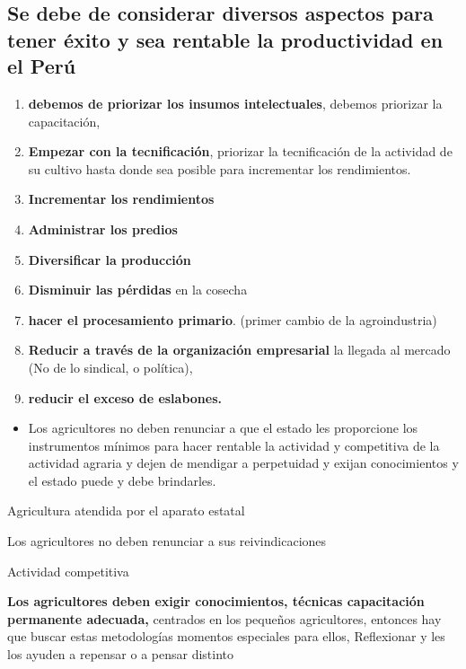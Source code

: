 \documentclass[
  a4paper,
]{article}
\providecommand{\tightlist}{%
  \setlength{\itemsep}{0pt}\setlength{\parskip}{0pt}}\usepackage{longtable,booktabs,array}
\begin{document}
\hypertarget{se-debe-de-considerar-diversos-aspectos-para-tener-uxe9xito-y-sea-rentable-la-productividad-en-el-peruxfa}{%
\subsection{Se debe de considerar diversos aspectos para tener éxito y
sea rentable la productividad en el
Perú}\label{se-debe-de-considerar-diversos-aspectos-para-tener-uxe9xito-y-sea-rentable-la-productividad-en-el-peruxfa}}

\begin{enumerate}
\def\labelenumi{\arabic{enumi}.}
\item
  \textbf{debemos de priorizar los insumos intelectuales}, debemos
  priorizar la capacitación,
\item
  \textbf{Empezar con la tecnificación}, priorizar la tecnificación de
  la actividad de su cultivo hasta donde sea posible para incrementar
  los rendimientos.
\item
  \textbf{Incrementar los rendimientos}
\item
  \textbf{Administrar los predios}
\item
  \textbf{Diversificar la producción}
\item
  \textbf{Disminuir las pérdidas} en la cosecha
\item
  \textbf{hacer el procesamiento primario}. (primer cambio de la
  agroindustria)
\item
  \textbf{Reducir a través de la organización empresarial} la llegada al
  mercado (No de lo sindical, o política),
\item
  \textbf{reducir el exceso de eslabones.}
\end{enumerate}

\begin{itemize}
\tightlist
\item
  Los agricultores no deben renunciar a que el estado les proporcione
  los instrumentos mínimos para hacer rentable la actividad y
  competitiva de la actividad agraria y dejen de mendigar a perpetuidad
  y exijan conocimientos y el estado puede y debe brindarles.
\end{itemize}

Agricultura atendida por el aparato estatal

Los agricultores no deben renunciar a sus reivindicaciones

Actividad competitiva

\textbf{Los agricultores deben exigir conocimientos, técnicas
capacitación permanente adecuada,} centrados en los pequeños
agricultores, entonces hay que buscar estas metodologías momentos
especiales para ellos, Reflexionar y les los ayuden a repensar o a
pensar distinto
\end{document}
